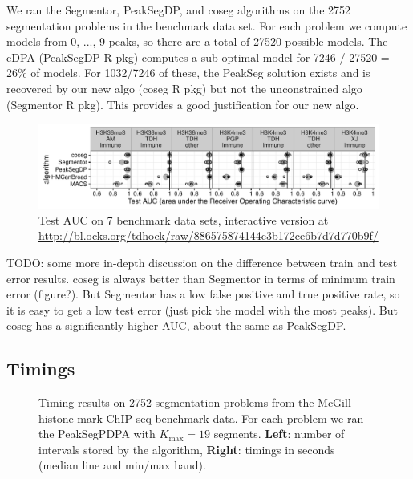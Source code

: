 \documentclass{article}
\begin{document}
We ran the Segmentor, PeakSegDP, and coseg algorithms on the 2752
segmentation problems in the benchmark data set. For each problem we
compute models from 0, ..., 9 peaks, so there are a total of 27520
possible models. The cDPA (PeakSegDP R pkg) computes a sub-optimal
model for 7246 / 27520 = 26\% of models. For 1032/7246 of these, the
PeakSeg solution exists and is recovered by our new algo (coseg R pkg)
but not the unconstrained algo (Segmentor R pkg). This provides a good
justification for our new algo.

\begin{figure}[b!]
  \centering
  \includegraphics[width=\textwidth]{figure-test-error-dots}
  \caption{Test AUC on 7 benchmark data sets, interactive version at 
\url{http://bl.ocks.org/tdhock/raw/886575874144c3b172ce6b7d7d770b9f/}}
  \label{fig:test-error-dots}
\end{figure}

TODO: some more in-depth discussion on the difference between train
and test error results. coseg is always better than Segmentor in terms
of minimum train error (figure?). But Segmentor has a low false
positive and true positive rate, so it is easy to get a low test error
(just pick the model with the most peaks). But coseg has a
significantly higher AUC, about the same as PeakSegDP.

\subsection{Timings}

\begin{figure}[b!]
  \centering
  \parbox{0.49\textwidth}{
    
  }
  \parbox{0.49\textwidth}{
    
  }
  \caption{Timing results on 2752 segmentation problems from the
    McGill histone mark ChIP-seq benchmark data. For each problem we
    ran the PeakSegPDPA with $K_{\text{max}}=19$ segments.
    \textbf{Left}: number of intervals stored by the algorithm,
    \textbf{Right}: timings in seconds (median line and min/max
    band).}
  \label{fig:timings}
\end{figure}



\end{document}
